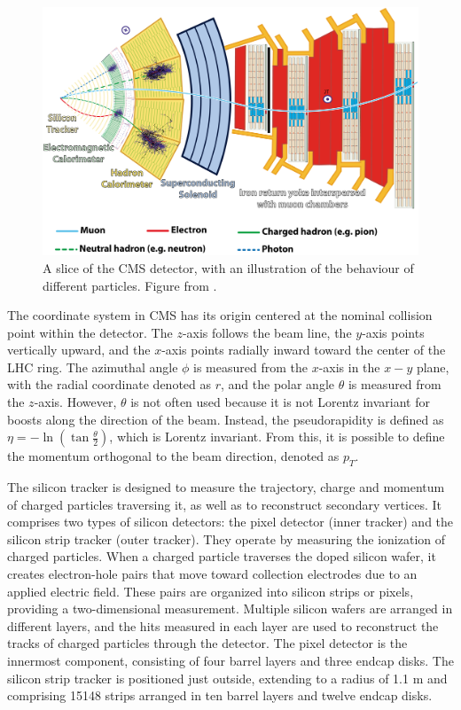 \begin{figure}[!ht]
    \vspace*{-0.0cm}
    \centering
    \setlength{\mylength}{\textwidth}
    \includegraphics[width=0.85\mylength]{resources/CMS_slice.png}
    \vspace*{-0.0cm}
    \caption{A slice of the CMS detector, with an illustration of the behaviour of different particles. Figure from \cite{Barney:2120661}.}
    \label{fig:CMS_slice}
    \vspace*{-0.3cm}
\end{figure}

The coordinate system in CMS has its origin centered at the nominal collision point within the detector. The $z$-axis follows the beam line, the $y$-axis points vertically upward, and the $x$-axis points radially inward toward the center of the LHC ring. The azimuthal angle $\phi$ is measured from the $x$-axis in the $x-y$ plane, with the radial coordinate denoted as $r$, and the polar angle $\theta$ is measured from the $z$-axis. However, $\theta$ is not often used because it is not Lorentz invariant for boosts along the direction of the beam. Instead, the pseudorapidity is defined as $\eta = -\ln{\left(\tan{\frac{\theta}{2}}\right)}$, which is Lorentz invariant. From this, it is possible to define the momentum orthogonal to the beam direction, denoted as $p_T$.

The silicon tracker is designed to measure the trajectory, charge and momentum of charged particles traversing it, as well as to reconstruct secondary vertices. It comprises two types of silicon detectors: the pixel detector (inner tracker) and the silicon strip tracker (outer tracker). They operate by measuring the ionization of charged particles. When a charged particle traverses the doped silicon wafer, it creates electron-hole pairs that move toward collection electrodes due to an applied electric field. These pairs are organized into silicon strips or pixels, providing a two-dimensional measurement. Multiple silicon wafers are arranged in different layers, and the hits measured in each layer are used to reconstruct the tracks of charged particles through the detector. The pixel detector is the innermost component, consisting of four barrel layers and three endcap disks. The silicon strip tracker is positioned just outside, extending to a radius of 1.1 m and comprising 15148 strips arranged in ten barrel layers and twelve endcap disks.

